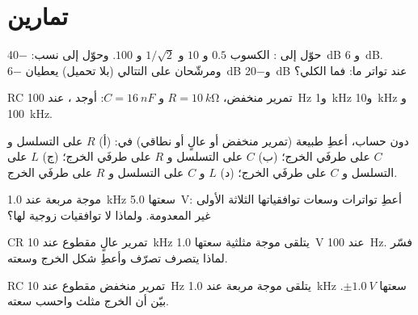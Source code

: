 \section{تمارين}

\begin{exercise}[$\star$]\label{exo:b1:filters-transfer-functions:1}
حوّل إلى : الكسوب $0.5$ و $10$ و $1/\sqrt2$ و $100$. وحوّل إلى
نسب: \qty{-40}{dB} و \qty{+6}{dB}. ومرشّحان على التتالي (بلا تحميل)
يعطيان \qty{-6}{dB} و\qty{-20}{dB} عند تواتر ما: فما  الكلي؟
\end{exercise}

\begin{exercise}[$\star$]\label{exo:b1:filters-transfer-functions:2}
 RC تمرير منخفض، $R = \qty{10}{k\ohm}$ و $C = \qty{16}{nF}$: أوجد ،
  عند \qty{100}{Hz} و\qty{1}{kHz} و\qty{10}{kHz} و
\qty{100}{kHz}.
\end{exercise}

\begin{exercise}[$\star$]\label{exo:b1:filters-transfer-functions:3}
دون حساب، أعطِ طبيعة  (تمرير منخفض أو عالٍ أو نطاقي) في: (أ)
$R$ على التسلسل و $C$ على طرفَي الخرج؛ (ب) $C$ على التسلسل و $R$ على طرفَي
الخرج؛ (ج) $L$ على التسلسل و $C$ على طرفَي الخرج؛ (د) $L$ و $C$ على
التسلسل و $R$ على طرفَي الخرج.
\end{exercise}

\begin{exercise}[$\star$]\label{exo:b1:filters-transfer-functions:4}
موجة مربعة عند \qty{1.0}{kHz} سعتها \qty{5.0}{V}: أعطِ
تواترات وسعات توافقياتها الثلاثة الأولى غير المعدومة. ولماذا
لا توافقيات زوجية لها؟
\end{exercise}

\begin{exercise}[$\star\star$]\label{exo:b1:filters-transfer-functions:5}
 CR تمرير عالٍ مقطوع عند \qty{10}{kHz} يتلقى موجة مثلثية
سعتها \qty{1.0}{V} عند \qty{100}{Hz}. فسّر لماذا يتصرف تصرّف
 وأعطِ شكل الخرج وسعته.
\end{exercise}

\begin{exercise}[$\star\star$]\label{exo:b1:filters-transfer-functions:6}
 RC تمرير منخفض مقطوع عند \qty{10}{Hz} يتلقى موجة مربعة عند
\qty{1.0}{kHz} سعتها $\pm\qty{1.0}{V}$. بيّن أن الخرج مثلث
واحسب سعته.
\end{exercise}


